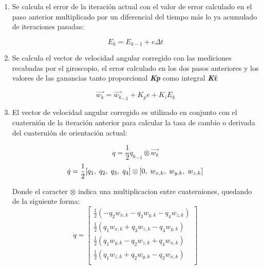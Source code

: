 \documentclass[conference]{IEEEtran}
\begin{document}
\begin{enumerate}
        \item Se calcula el error de la iteración actual con el valor de error calculado en el paso anterior multiplicado por un diferencial del tiempo más lo ya acumulado de iteraciones pasadas:
 
        \begin{equation}
                E_k = E_{k-1} + e\Delta t
        \end{equation}

        \item Se calcula el vector de velocidad angular corregido con las mediciones recabadas por el giroscopio, el error calculado en los dos pasos anteriores y los valores de las ganancias tanto proporcional \textbf{\textit{Kp}} como integral \textbf{\textit{Ki}}:
        
        \begin{equation}
            \vec{w_k} = \vec{w_k}_{-1} + K_pe +K_iE_k 
        \end{equation}
            
        \item El vector de velocidad angular corregido es utilizado en conjunto con el cuaternión de la iteración anterior para calcular la tasa de cambio o derivada del cuaternión de orientación actual:
        
        \begin{equation}
            \dot{q} = \frac{1}{2}{q_k}_{-1} \otimes \vec{w_k} 
        \end{equation}
        \begin{equation}
            \dot{q} = \frac{1}{2}[q_1, \hspace{1mm} q_2, \hspace{1mm} q_3, \hspace{1mm} q_4] \otimes [0, \hspace{1mm} w_{x,k}, \hspace{1mm} w_{y,k}, \hspace{1mm} w_{z,k}] 
        \end{equation}

        Donde el caracter $ \otimes $  indica una multiplicacion entre cuaterniones, quedando de la siguiente forma:
        \begin{equation}
            \dot{q} = 
                \begin{bmatrix}
                    \frac{1}{2}(-q_2w_{x,k} - q_3w_{y,k} - q_4w_{z,k}) \\
                    \frac{1}{2}( q_1w_{x,k} + q_3w_{z,k} - q_4w_{y,k}) \\
                    \frac{1}{2}( q_1w_{y,k} - q_2w_{z,k} + q_4w_{x,k}) \\
                    \frac{1}{2}( q_1w_{z,k} + q_2w_{y,k} - q_3w_{x,k}) \\
                \end{bmatrix} 
        \end{equation}    


\end{enumerate}
\end{document}
